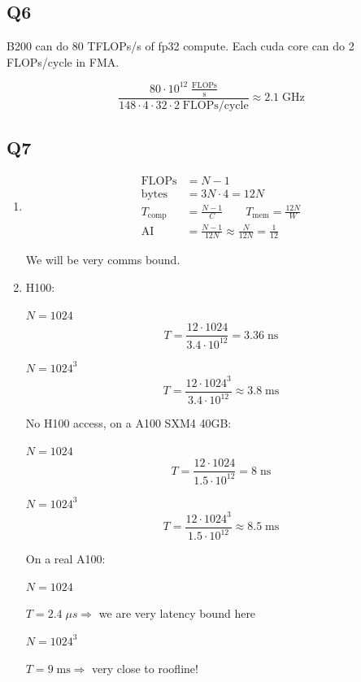 \documentclass[11pt]{article}
\newcommand{\Tcomp}{T_{\text{comp}}}
\begin{document}
\subsection*{Q6}

B200 can do 80 TFLOPs/s of fp32 compute. Each cuda core can do 2 FLOPs/cycle in FMA.

\[
\frac{80 \cdot 10^{12} \;\frac{\text{FLOPs}}{\text{s}}}{148 \cdot 4 \cdot 32 \cdot 2 \;\text{FLOPs/cycle}} \approx 2.1 \;\text{GHz}
\]

\subsection*{Q7}

\begin{enumerate}[label=(\roman*)]
    \item \begin{align*}
    \text{FLOPs} &= N - 1 \\
    \text{bytes} &= 3N \cdot 4 = 12N \\
    \Tcomp &= \frac{N-1}{C} \qquad T_{\text{mem}} = \frac{12N}{W} \\
    \text{AI} &= \frac{N-1}{12N} \approx \frac{N}{12N} = \frac{1}{12}
    \end{align*}

    We will be very comms bound.

    \item H100:

    $N = 1024$
    \[
    T = \frac{12 \cdot 1024}{3.4 \cdot 10^{12}} = 3.36 \;\text{ns}
    \]

    $N = 1024^3$
    \[
    T = \frac{12 \cdot 1024^3}{3.4 \cdot 10^{12}} \approx 3.8 \;\text{ms}
    \]

    No H100 access, on a A100 SXM4 40GB:

    $N = 1024$
    \[
    T = \frac{12 \cdot 1024}{1.5 \cdot 10^{12}} = 8 \;\text{ns}
    \]

    $N = 1024^3$
    \[
    T = \frac{12 \cdot 1024^3}{1.5 \cdot 10^{12}} \approx 8.5 \;\text{ms}
    \]

    On a real A100:

    $N = 1024$

    $T = 2.4 \;\mu s \Rightarrow$ we are very latency bound here

    $N = 1024^3$

    $T = 9 \;\text{ms} \Rightarrow$ very close to roofline!
\end{enumerate}
\end{document}
